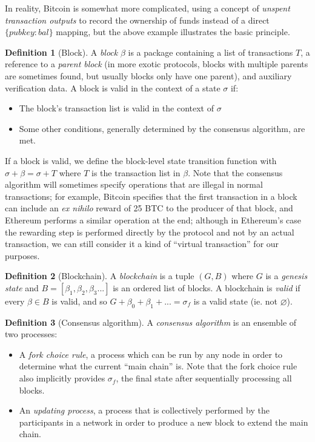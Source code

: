 \documentclass[11pt,a4paper]{article}
\theoremstyle{plain}
\theoremstyle{definition}
\newtheorem{defn}{Definition}[section]
\theoremstyle{remark}
\begin{document}
In reality, Bitcoin is somewhat more complicated, using a concept of \emph{unspent transaction outputs} to record the ownership of funds instead of a direct $\{pubkey: bal\}$ mapping, but the above example illustrates the basic principle.

\begin{defn}[Block]
A \emph{block} $\beta$ is a package containing a list of transactions $T$, a reference to a \emph{parent block} (in more exotic protocols, blocks with multiple parents are sometimes found, but usually blocks only have one parent), and auxiliary verification data. A block is valid in the context of a state $\sigma$ if:
\begin{itemize}
\item
The block's transaction list is valid in the context of $\sigma$
\item
Some other conditions, generally determined by the consensus algorithm, are met.
\end{itemize}
If a block is valid, we define the block-level state transition function with $\sigma + \beta = \sigma + T$ where $T$ is the transaction list in $\beta$. Note that the consensus algorithm will sometimes specify operations that are illegal in normal transactions; for example, Bitcoin specifies that the first transaction in a block can include an \emph{ex nihilo} reward of 25 BTC to the producer of that block, and Ethereum performs a similar operation at the end; although in Ethereum's case the rewarding step is performed directly by the protocol and not by an actual transaction, we can still consider it a kind of ``virtual transaction'' for our purposes.
\end{defn}

\begin{defn}[Blockchain]
A \emph{blockchain} is a tuple $(G, B)$ where $G$ is a \emph{genesis state} and $B = [\beta_1, \beta_2, \beta_3 ...]$ is an ordered list of blocks. A blockchain is \emph{valid} if every $\beta \in B$ is valid, and so $G + \beta_0 + \beta_1 + ... = \sigma_f$ is a valid state (ie. not $\varnothing$).
\end{defn}

\begin{defn}[Consensus algorithm]
A \emph{consensus algorithm} is an ensemble of two processes:
\begin{itemize}
\item
A \emph{fork choice rule}, a process which can be run by any node in order to determine what the current ``main chain'' is. Note that the fork choice rule also implicitly provides $\sigma_f$, the final state after sequentially processing all blocks.
\item
An \emph{updating process}, a process that is collectively performed by the participants in a network in order to produce a new block to extend the main chain.
\end{itemize}
\end{defn}
\end{document}
